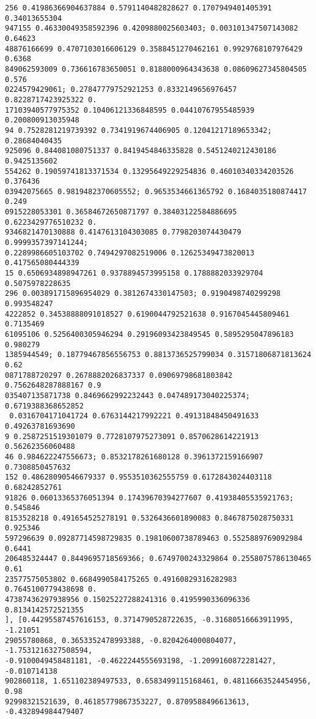 \documentclass[12pt,a4paper]{article}
\begin{document}
\begin{lstlisting}
256 0.41986366904637884 0.5791140482828627 0.1707949401405391 0.34013655304
947155 0.46330049358592396 0.4209880025603403; 0.003101347507143082 0.64623
48876166699 0.4707103016606129 0.3588451270462161 0.9929768107976429 0.6368
849062593009 0.736616783650051 0.8188000964343638 0.08609627345804505 0.576
0224579429061; 0.27847779752921253 0.8332149656976457 0.8228717423925322 0.
17103940577975352 0.10406121336848595 0.04410767955485939 0.200800913035948
94 0.7528281219739392 0.7341919674406905 0.12041217189653342; 0.28684040435
925096 0.844081080751337 0.8419454846335828 0.5451240212430186 0.9425135602
554262 0.19059741813371534 0.13295649229254836 0.46010340334203526 0.376436
03942075665 0.9819482370605552; 0.9653534661365792 0.1684035180874417 0.249
0915228053301 0.36584672650871797 0.38403122584886695 0.6223429776510232 0.
9346821470130888 0.4147613104303085 0.7798203074430479 0.9999357397141244; 
0.2289986605103702 0.7494297082519006 0.12625349473820013 0.417565080444339
15 0.6506934898947261 0.9378894573995158 0.1788882033929704 0.5075978228635
296 0.003891715896954029 0.3812674330147503; 0.9190498740299298 0.993548247
4222852 0.34538888091018527 0.6190044792521638 0.9167045445809461 0.7135469
61095106 0.5256400305946294 0.29196093423849545 0.5895295047896183 0.980279
1385944549; 0.18779467856556753 0.8813736525799034 0.31571806871813624 0.62
0871788720297 0.2678882026837337 0.09069798681803842 0.7562648287888167 0.9
035407135871738 0.8469662992232443 0.047489173040225374; 0.6719388368652852
 0.0316704171041724 0.6763144217992221 0.49131848450491633 0.49263781693690
9 0.2587251519301079 0.7728107975273091 0.8570628614221913 0.56262356060488
46 0.984622247556673; 0.8532178261680128 0.3961372159166907 0.7308850457632
152 0.48628090546679337 0.9553510362555759 0.6172843024403118 0.68242852761
91826 0.06013365376051394 0.17439670394277607 0.41938405535921763; 0.545846
8153528218 0.491654525278191 0.5326436601890083 0.8467875028750331 0.925346
597296639 0.09287714598729835 0.19810600738789463 0.5525889769092984 0.6441
206485324447 0.8449695718569366; 0.6749700243329864 0.2558075786130465 0.61
23577575053802 0.6684990584175265 0.49160829316282983 0.7645100779438698 0.
47387436297938956 0.15025227288241316 0.4195990336096336 0.8134142572521355
], [0.44295587457616153, 0.3714790528722635, -0.31680516663911995, -1.21051
29055780868, 0.3653352478993388, -0.8204264000804077, -1.7531216327508594, 
-0.9100049458481181, -0.4622244555693198, -1.2099160872281427, -0.010714138
902860118, 1.651102389497533, 0.6583499115168461, 0.48116663524454956, 0.98
92998321521639, 0.46185779867353227, 0.8709588496613613, -0.432894984479407

\end{lstlisting}
\end{document}

